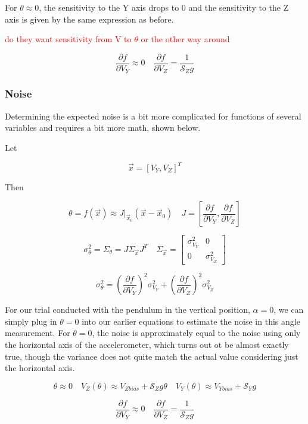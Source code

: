 \documentclass{article}
\newcommand{\xxx}[1]{\textcolor{red}{#1}}
\theoremstyle{plain}
\theoremstyle{definition}
\theoremstyle{remark}
\newcommand{\Sens}{\mathcal{S}}
\begin{document}
For $\theta \approx 0$, the sensitivity to the Y axis drops to 0 and the sensitivity to the Z axis is given by the same expression as before. 

\xxx{do they want sensitivity from V to $\theta$ or the other way around}

$$ \frac{\partial f}{\partial V_{Y}} \approx 0  \quad \frac{\partial f }{\partial V_Z} = \frac{1}{\Sens_{Z} g}$$

\subsubsection{Noise}

Determining the expected noise is a bit more complicated for functions of several variables and requires a bit more math, shown below.   

Let 

$$ \vec{x} = \left[ V_Y, V_Z \right]^T $$

Then

$$ \theta = f(\vec{x}) \approx J|_{\vec{x}_0} \left( \vec{x} - \vec{x}_{0}\right) \quad J = \left[ \frac{\partial f}{\partial V_{Y}}, \frac{\partial f }{\partial V_Z} \right] $$

$$ \sigma^2_{\theta} = \Sigma_{\theta} = J \Sigma_{\vec{x}} J^T  \quad 
\Sigma_{\vec{x}} = \left[
\begin{matrix}
\sigma^2_{V_{Y}}  & 0 \\
0 & \sigma^2_{V_{Z}} 
\end{matrix} \right]$$

$$ \sigma^2_{\theta} = \left(\frac{\partial f}{\partial V_{Y}}\right)^2 \sigma^2_{V_{Y}} + \left(\frac{\partial f }{\partial V_Z} \right)^2 \sigma^2_{V_{Z}} $$

For our trial conducted with the pendulum in the vertical position, $\alpha = 0$, we can simply plug in $\theta = 0$ into our earlier equations to estimate the noise in this angle measurement.  For $\theta = 0$, the noise is approximately equal to the noise using only the horizontal axis of the accelerometer, which turns out ot be almost exactly true, though the variance does not quite match the actual value considering just the horizontal axis.

$$ \theta \approx 0 \quad V_{Z}(\theta) \approx V_{Zbias} + \Sens_{Z} g \theta \quad V_{Y}(\theta)  \approx V_{Ybias} + \Sens_{Y} g $$

$$ \frac{\partial f}{\partial V_{Y}} \approx 0  \quad \frac{\partial f }{\partial V_Z} = \frac{1}{\Sens_{Z} g}$$
\end{document}
